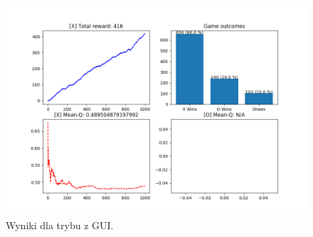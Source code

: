 \begin{figure}[H]
	\centering
	\includegraphics[width=0.7\linewidth]{imgs/q_learning/overview/gui_plots}
	\caption{Wyniki dla trybu z GUI.}
\end{figure}

\pagebreak